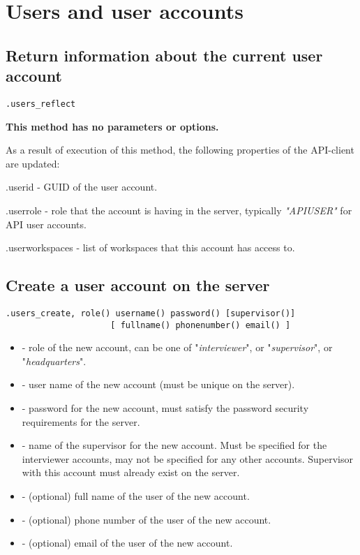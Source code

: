 \section{Users and user accounts}

\subsection{Return information about the current user account}
\begin{lstlisting}[style=CommandLineStyle]
.users_reflect
\end{lstlisting}

\textbf{This method has no parameters or options.}

\savedres

As a result of execution of this method, the following properties of the API-client are updated:

\begin{compactitem}
    \item .userid - GUID of the user account.
    \item .userrole - role that the account is having in the server, typically \textit{"APIUSER"} for API user accounts.
    \item .userworkspaces - list of workspaces that this account has access to.
\end{compactitem}


\subsection{Create a user account on the server}
\begin{lstlisting}[style=CommandLineStyle]
.users_create, role() username() password() [supervisor()]
                     [ fullname() phonenumber() email() ]
\end{lstlisting}

\optsheader
\begin{itemize}
      \item {} - role of the new account, can be one of "\textit{interviewer}", or "\textit{supervisor}", or "\textit{headquarters}".
      \item {} - user name of the new account (must be unique on the server).
      \item {} - password for the new account, must satisfy the password security requirements for the server.
      \item {} - name of the supervisor for the new account. Must be specified for the interviewer accounts, may not be specified for any other accounts. Supervisor with this account must already exist on the server.
     \item {} - (optional) full name of the user of the new account.
     \item {} - (optional) phone number of the user of the new account.
     \item {} - (optional) email of the user of the new account.
\end{itemize}

